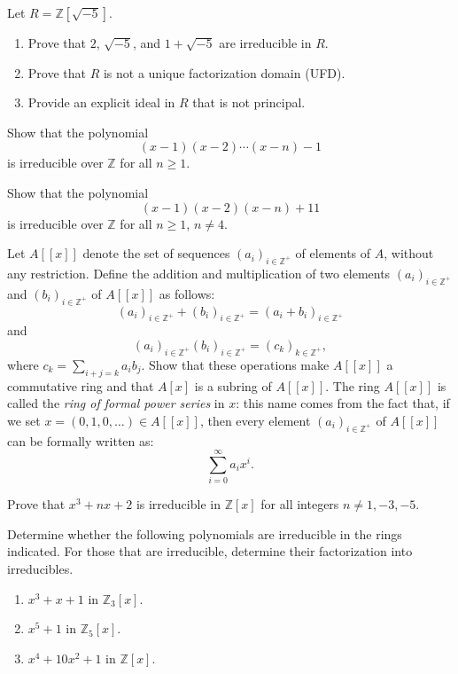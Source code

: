 \documentclass[
    11pt,a4paper,
]{exam}
\begin{document}
\begin{questions}
\question
Let $R = \mathbb{Z}[\sqrt{-5}]$.
\begin{enumerate}[label=(\roman*)]
    \item Prove that $2$, $\sqrt{-5}$, and $1 + \sqrt{-5}$ are irreducible in $R$.
    \item Prove that $R$ is not a unique factorization domain (UFD).
    \item Provide an explicit ideal in $R$ that is not principal.
\end{enumerate}

\question
Show that the polynomial
\[
(x - 1)(x - 2) \cdots (x - n) - 1
\]
is irreducible over $\mathbb{Z}$ for all $n \geq 1$.


\question
Show that the polynomial 
\[
(x - 1)(x - 2)(x - n) + 11
\]
is irreducible over $\mathbb{Z}$ for all $n \geq 1$, $n \neq 4$.

\question
Let $A[[x]]$ denote the set of sequences $(a_i)_{i \in \mathbb{Z}^+}$ of elements of $A$, without any restriction. Define the addition and multiplication of two elements $(a_i)_{i \in \mathbb{Z}^+}$ and $(b_i)_{i \in \mathbb{Z}^+}$ of $A[[x]]$ as follows:
\[
(a_i)_{i \in \mathbb{Z}^+} + (b_i)_{i \in \mathbb{Z}^+} = (a_i + b_i)_{i \in \mathbb{Z}^+}
\]
and
\[
(a_i)_{i \in \mathbb{Z}^+}(b_i)_{i \in \mathbb{Z}^+} = (c_k)_{k \in \mathbb{Z}^+},
\]
where $c_k = \sum_{i+j=k} a_i b_j$. Show that these operations make $A[[x]]$ a commutative ring and that $A[x]$ is a subring of $A[[x]]$. The ring $A[[x]]$ is called the \emph{ring of formal power series} in $x$: this name comes from the fact that, if we set $x = (0, 1, 0, \dots) \in A[[x]]$, then every element $(a_i)_{i \in \mathbb{Z}^+}$ of $A[[x]]$ can be formally written as:
\[
\sum_{i=0}^\infty a_i x^i.
\]

\question
Prove that $x^3 + nx + 2$ is irreducible in $\mathbb{Z}[x]$ for all integers $n \neq 1, -3, -5$.

\question
Determine whether the following polynomials are irreducible in the rings indicated. For those that are irreducible, determine their factorization into irreducibles.
\begin{enumerate}[label=(\roman*)]
    \item $x^3 + x + 1$ in $\mathbb{Z}_3[x]$.
    \item $x^5 + 1$ in $\mathbb{Z}_5[x]$.
    \item $x^4 + 10x^2 + 1$ in $\mathbb{Z}[x]$.
\end{enumerate}


\end{questions}
\end{document}
